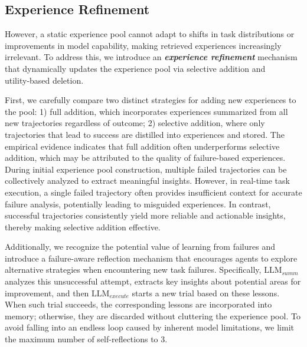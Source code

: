 \documentclass[11pt]{article}
\begin{document}
\subsection{Experience Refinement}\label{sec:refinement}
However, a static experience pool cannot adapt to shifts in task distributions or improvements in model capability, making retrieved experiences increasingly irrelevant.
To address this, we introduce an \textbf{\textit{experience refinement}} mechanism that dynamically updates the experience pool via selective addition and utility‑based deletion. 

First, we carefully compare two distinct strategies for adding new experiences to the pool: 
1) full addition, which incorporates experiences summarized from all new trajectories regardless of outcome; 2) selective addition, where only trajectories that lead to success are distilled into experiences and stored. 
The empirical evidence indicates that full addition often underperforms selective addition, which may be attributed to the quality of failure-based experiences. 
During initial experience pool construction, multiple failed trajectories can be collectively analyzed to extract meaningful insights. 
However, in real-time task execution, a single failed trajectory often provides insufficient context for accurate failure analysis, potentially leading to misguided experiences. 
In contrast, successful trajectories consistently yield more reliable and actionable insights, thereby making selective addition effective.

Additionally, we recognize the potential value of learning from failures and introduce a failure-aware reflection mechanism that encourages agents to explore alternative strategies when encountering new task failures. 
Specifically, $\text{LLM}_{summ}$ analyzes this unsuccessful attempt, extracts key insights about potential areas for improvement, and then $\text{LLM}_{execute}$ starts a new trial based on these lessons. 
When such trial succeeds, the corresponding lessons are incorporated into memory; otherwise, they are discarded without cluttering the experience pool. 
To avoid falling into an endless loop caused by inherent model limitations, we limit the maximum number of self-reflections to 3. 
\end{document}
